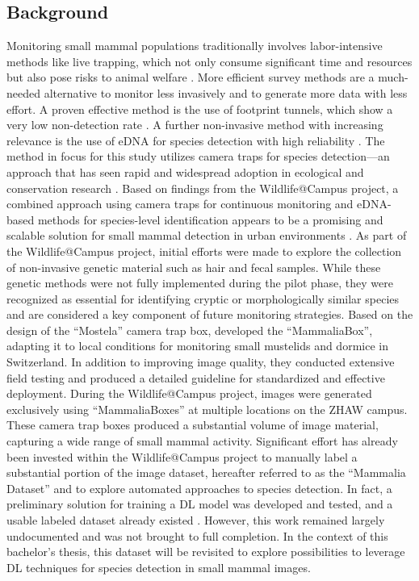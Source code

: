 \subsection{Background}
Monitoring small mammal populations traditionally involves labor-intensive methods like live trapping, which not only consume significant time and resources but also pose risks to animal welfare \autocite{grafWildlifeCampusKleineSaeugetiere2022}.
More efficient survey methods are a much-needed alternative to monitor less invasively and to generate more data with less effort.
A proven effective method is the use of footprint tunnels, which show a very low non-detection rate \autocite{yarnellUsingOccupancyAnalysis2014}.
A further non-invasive method with increasing relevance is the use of \ac{eDNA} for species detection with high reliability \autocite{thomsenEnvironmentalDNAEmerging2015}.
The method in focus for this study utilizes camera traps for species detection---an approach that has seen rapid and widespread adoption in ecological and conservation research \autocite{delisleNextGenerationCameraTrapping2021}.
Based on findings from the Wildlife@Campus project, a combined approach using camera traps for continuous monitoring and \acs{eDNA}-based methods for species-level identification appears to be a promising and scalable solution for small mammal detection in urban environments \autocite{grafWildlifeCampusKleineSaeugetiere2022}.
As part of the Wildlife@Campus project, initial efforts were made to explore the collection of non-invasive genetic material such as hair and fecal samples.
While these genetic methods were not fully implemented during the pilot phase, they were recognized as essential for identifying cryptic or morphologically similar species and are considered a key component of future monitoring strategies.
Based on the design of the \enquote{Mostela} camera trap box, \textcite{aegerterMonitoringKleinmustelidenSchlaefern2019} developed the \enquote{MammaliaBox}, adapting it to local conditions for monitoring small mustelids and dormice in Switzerland.
In addition to improving image quality, they conducted extensive field testing and produced a detailed guideline for standardized and effective deployment.
During the Wildlife@Campus project, images were generated exclusively using \enquote{MammaliaBoxes} at multiple locations on the ZHAW campus. 
These camera trap boxes produced a substantial volume of image material, capturing a wide range of small mammal activity.
Significant effort has already been invested within the Wildlife@Campus project to manually label a substantial portion of the image dataset, hereafter referred to as the \enquote{Mammalia Dataset} and to explore automated approaches to species detection.
In fact, a preliminary solution for training a \ac{DL} model was developed and tested, and a usable labeled dataset already existed \autocite{ratnaweeraWildlifeCampusProgressReports2021}.
However, this work remained largely undocumented and was not brought to full completion. 
In the context of this bachelor's thesis, this dataset will be revisited to explore possibilities to leverage \ac{DL} techniques for species detection in small mammal images.

